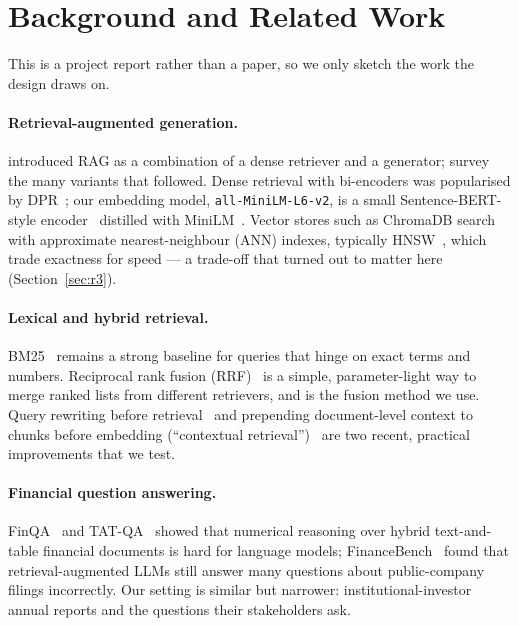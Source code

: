 \documentclass[11pt,a4paper]{article}
\begin{document}
\section{Background and Related Work}
\label{sec:related}
This is a project report rather than a paper, so we only sketch the work the design draws on.

\paragraph{Retrieval-augmented generation.}
\citet{lewis2020rag} introduced RAG as a combination of a dense retriever and a generator; \citet{gao2023ragsurvey}
survey the many variants that followed. Dense retrieval with bi-encoders was popularised by
DPR~\citep{karpukhin2020dpr}; our embedding model, \texttt{all-MiniLM-L6-v2}, is a small Sentence-BERT-style
encoder~\citep{reimers2019sbert} distilled with MiniLM~\citep{wang2020minilm}. Vector stores such as ChromaDB search
with approximate nearest-neighbour (ANN) indexes, typically HNSW~\citep{malkov2018hnsw}, which trade exactness for
speed --- a trade-off that turned out to matter here (Section~\ref{sec:r3}).

\paragraph{Lexical and hybrid retrieval.}
BM25~\citep{robertson2009bm25} remains a strong baseline for queries that hinge on exact terms and numbers.
Reciprocal rank fusion (RRF)~\citep{cormack2009rrf} is a simple, parameter-light way to merge ranked lists from
different retrievers, and is the fusion method we use. Query rewriting before retrieval~\citep{ma2023queryrewrite}
and prepending document-level context to chunks before embedding (``contextual retrieval'')~\citep{anthropic2024contextual}
are two recent, practical improvements that we test.

\paragraph{Financial question answering.}
FinQA~\citep{chen2021finqa} and TAT-QA~\citep{zhu2021tatqa} showed that numerical reasoning over hybrid
text-and-table financial documents is hard for language models; FinanceBench~\citep{islam2023financebench} found
that retrieval-augmented LLMs still answer many questions about public-company filings incorrectly. Our setting is
similar but narrower: institutional-investor annual reports and the questions their stakeholders ask.
\end{document}
